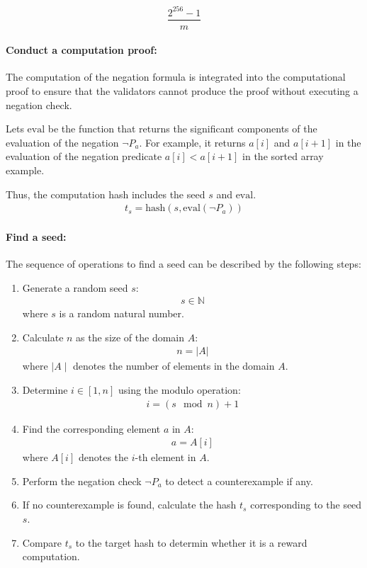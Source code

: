 \documentclass[runningheads]{llncs}
\begin{document}
\[
\frac{2^{256} - 1}{m}
\]
\paragraph{Conduct a computation proof:} The computation of the negation formula is integrated into the computational proof to ensure that the validators cannot produce the proof without executing a negation check.

Lets \(\text{eval}\) be the function that returns the significant components of the evaluation of the negation \(\neg P_{a}\).  For example, it returns \(a[i]\) and \(a[i + 1]\) in the evaluation of the negation predicate \(a[i] < a[i+1]\) in the sorted array example.

Thus, the computation hash includes the seed  \( s \) and \(\text{eval}\). 
\begin{align}
t_s = \text{hash}(s, \text{eval}(\neg P_{a}))
\end{align}
\paragraph{Find a seed:}
The sequence of operations to find a seed can be described by the following steps:
\begin{enumerate}
\item Generate a random seed $s$: 
\begin{align}
s \in \mathbb{N} 
\end{align}
where $s$ is a random natural number.
\item Calculate $n$ as the size of the domain $A$: 
\begin{align}
n = |A|
\end{align}
where $\mid A \mid$ denotes the number of elements in the domain $A$.
\item Determine $i \in [1, n]$ using the modulo operation:
\begin{align}
i = (s \mod n) + 1
\end{align}
\item Find the corresponding element $a$ in $A$:
\begin{align}
a=A[i]
\end{align}
where $A[i]$ denotes the $i$-th element in $A$.
\item Perform the negation check $\neg P_{a}$ to detect a counterexample if any.

\item If no counterexample is found, calculate the hash \( t_s \) corresponding to the seed \( s \).
\item Compare \( t_s \) to the target hash to determin whether it is a reward computation.
\end{enumerate}
\end{document}
